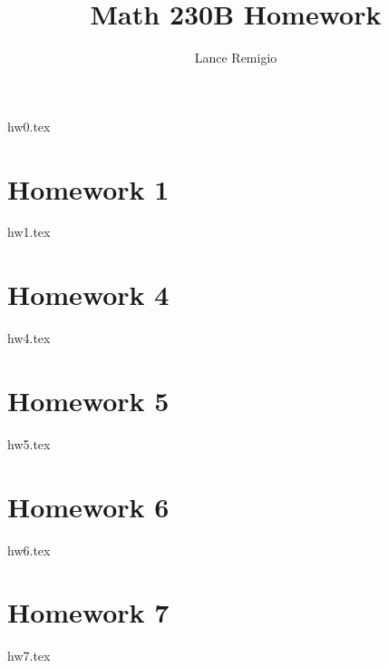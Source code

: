\documentclass[a4paper]{article}
\title{Math 230B Homework}
\author{Lance Remigio}
\begin{document}
\maketitle

{hw0.tex}

\section*{Homework 1}

{hw1.tex}



\section*{Homework 4}

{hw4.tex}

\section*{Homework 5}

{hw5.tex}

\section*{Homework 6}

{hw6.tex}

\section*{Homework 7}

{hw7.tex}
\end{document}
